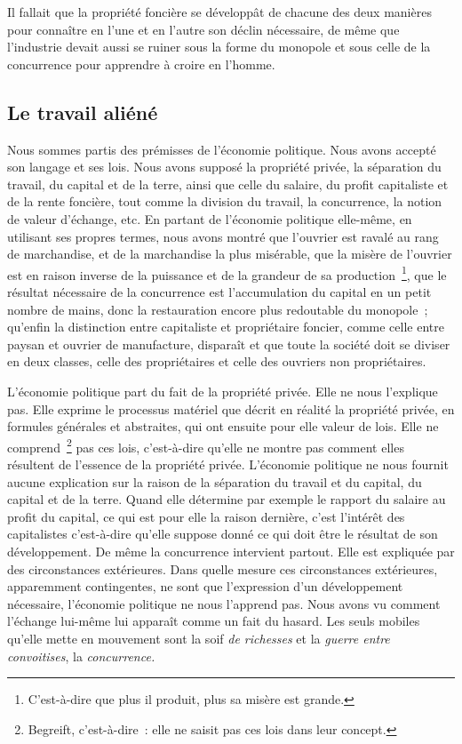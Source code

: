 \documentclass[french,twoside]{book} %
\begin{document}
Il fallait que la propriété foncière se développât de chacune des deux manières pour connaître en l’une et en l’autre son déclin nécessaire, de même que l’industrie devait aussi se ruiner sous la forme du monopole et sous celle de la concurrence pour apprendre à croire en l’homme.
\subsection[{Le travail aliéné}]{Le travail aliéné}
\noindent [XXII] Nous sommes partis des prémisses de l’économie politique. Nous avons accepté son langage et ses lois. Nous avons supposé la propriété privée, la séparation du travail, du capital et de la terre, ainsi que celle du salaire, du profit capitaliste et de la rente foncière, tout comme la division du travail, la concurrence, la notion de valeur d’échange, etc. En partant de l’économie politique elle-même, en utilisant ses propres termes, nous avons montré que l’ouvrier est ravalé au rang de marchandise, et de la marchandise la plus misérable, que la misère de l’ouvrier est en raison inverse de la puissance et de la grandeur de sa production \footnote{C’est-à-dire que plus il produit, plus sa misère est grande.}, que le résultat nécessaire de la concurrence est l’accumulation du capital en un petit nombre de mains, donc la restauration encore plus redoutable du monopole ; qu’enfin la distinction entre capitaliste et propriétaire foncier, comme celle entre paysan et ouvrier de manufacture, disparaît et que toute la société doit se diviser en deux classes, celle des propriétaires et celle des ouvriers non propriétaires.\par
L’économie politique part du fait de la propriété privée. Elle ne nous l’explique pas. Elle exprime le processus matériel que décrit en réalité la propriété privée, en formules générales et abstraites, qui ont ensuite pour elle valeur de lois. Elle ne comprend \footnote{Begreift, c’est-à-dire : elle ne saisit pas ces lois dans leur concept.} pas ces lois, c’est-à-dire qu’elle ne montre pas comment elles résultent de l’essence de la propriété privée. L’économie politique ne nous fournit aucune explication sur la raison de la séparation du travail et du capital, du capital et de la terre. Quand elle détermine par exemple le rapport du salaire au profit du capital, ce qui est pour elle la raison dernière, c’est l’intérêt des capitalistes c’est-à-dire qu’elle suppose donné ce qui doit être le résultat de son développement. De même la concurrence intervient partout. Elle est expliquée par des circonstances extérieures. Dans quelle mesure ces circonstances extérieures, apparemment contingentes, ne sont que l’expression d’un développement nécessaire, l’économie politique ne nous l’apprend pas. Nous avons vu comment l’échange lui-même lui apparaît comme un fait du hasard. Les seuls mobiles qu’elle mette en mouvement sont la soif \emph{de richesses} et la \emph{guerre entre convoitises}, la \emph{concurrence.}\par
\end{document}
